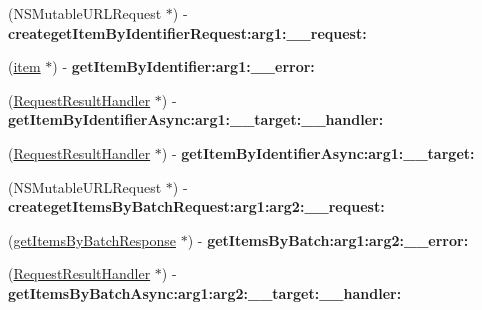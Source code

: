 \begin{DoxyCompactItemize}
\item 
\hypertarget{interface_supply_chain_service_port_binding_a104c46fbe7ac9102664ee2158685dea4}{}(N\+S\+Mutable\+U\+R\+L\+Request $\ast$) -\/ {\bfseries createget\+Item\+By\+Identifier\+Request\+:arg1\+:\+\_\+\+\_\+request\+:}\label{interface_supply_chain_service_port_binding_a104c46fbe7ac9102664ee2158685dea4}

\item 
\hypertarget{interface_supply_chain_service_port_binding_a1d020013aa81bb71f017bd499f172fa0}{}(\hyperlink{interfaceitem}{item} $\ast$) -\/ {\bfseries get\+Item\+By\+Identifier\+:arg1\+:\+\_\+\+\_\+error\+:}\label{interface_supply_chain_service_port_binding_a1d020013aa81bb71f017bd499f172fa0}

\item 
\hypertarget{interface_supply_chain_service_port_binding_ac74914c6b3c8e1501bc724f60f9e4b2a}{}(\hyperlink{interface_request_result_handler}{Request\+Result\+Handler} $\ast$) -\/ {\bfseries get\+Item\+By\+Identifier\+Async\+:arg1\+:\+\_\+\+\_\+target\+:\+\_\+\+\_\+handler\+:}\label{interface_supply_chain_service_port_binding_ac74914c6b3c8e1501bc724f60f9e4b2a}

\item 
\hypertarget{interface_supply_chain_service_port_binding_af32b9a0f9e239fc6cb971d3591b9f9fe}{}(\hyperlink{interface_request_result_handler}{Request\+Result\+Handler} $\ast$) -\/ {\bfseries get\+Item\+By\+Identifier\+Async\+:arg1\+:\+\_\+\+\_\+target\+:}\label{interface_supply_chain_service_port_binding_af32b9a0f9e239fc6cb971d3591b9f9fe}

\item 
\hypertarget{interface_supply_chain_service_port_binding_ad42c9f60b48134b8b45da0d9d05364bd}{}(N\+S\+Mutable\+U\+R\+L\+Request $\ast$) -\/ {\bfseries createget\+Items\+By\+Batch\+Request\+:arg1\+:arg2\+:\+\_\+\+\_\+request\+:}\label{interface_supply_chain_service_port_binding_ad42c9f60b48134b8b45da0d9d05364bd}

\item 
\hypertarget{interface_supply_chain_service_port_binding_a4d762a0ff3bd0412d142907ae31eb510}{}(\hyperlink{interfaceget_items_by_batch_response}{get\+Items\+By\+Batch\+Response} $\ast$) -\/ {\bfseries get\+Items\+By\+Batch\+:arg1\+:arg2\+:\+\_\+\+\_\+error\+:}\label{interface_supply_chain_service_port_binding_a4d762a0ff3bd0412d142907ae31eb510}

\item 
\hypertarget{interface_supply_chain_service_port_binding_a783652f55e24f115cf7bbac684aeb18b}{}(\hyperlink{interface_request_result_handler}{Request\+Result\+Handler} $\ast$) -\/ {\bfseries get\+Items\+By\+Batch\+Async\+:arg1\+:arg2\+:\+\_\+\+\_\+target\+:\+\_\+\+\_\+handler\+:}\label{interface_supply_chain_service_port_binding_a783652f55e24f115cf7bbac684aeb18b}


\end{DoxyCompactItemize}
